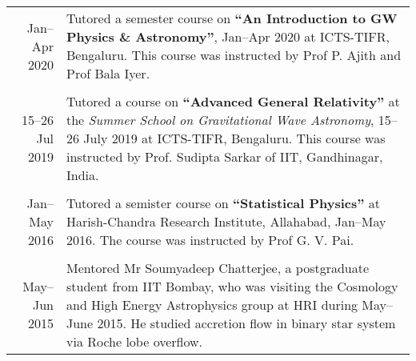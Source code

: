 \documentclass[10pt]{article}
\begin{document}
\begin{longtable}{rp{14cm}}
  Jan--Apr 2020 & {Tutored} a semester course on {\bfseries ``An Introduction to GW Physics \& Astronomy''}, Jan--Apr 2020 at ICTS-TIFR, Bengaluru. This course was instructed by Prof P. Ajith and Prof Bala Iyer.\\\\

  15--26 Jul 2019 & {Tutored} a course on {\bfseries ``Advanced General Relativity''} at the {\itshape Summer School on Gravitational Wave Astronomy}, 15--26 July 2019 at ICTS-TIFR, Bengaluru. This course was instructed by Prof. Sudipta Sarkar of IIT, Gandhinagar, India.\\\\

  Jan--May 2016 & {Tutored} a semister course on {\bfseries ``Statistical Physics''} at Harish-Chandra Research Institute, Allahabad, Jan--May 2016. The course was instructed by Prof G. V. Pai.\\\\

  May--Jun 2015 & {Mentored} Mr Soumyadeep Chatterjee, a postgraduate student from IIT Bombay, who was visiting the Cosmology and High Energy Astrophysics group at HRI during May--June 2015. He studied accretion flow in binary star system via Roche lobe overflow.
\end{longtable}
\end{document}
